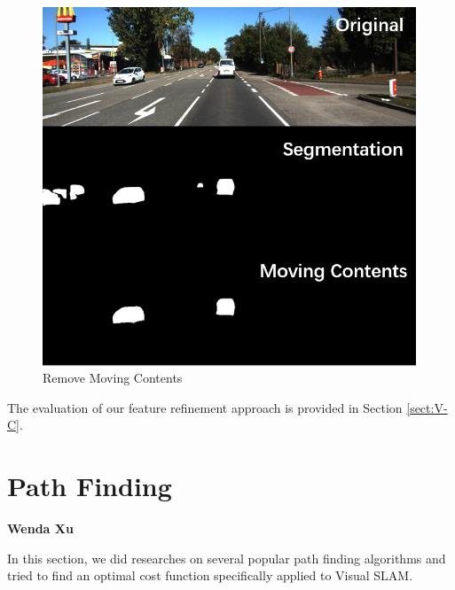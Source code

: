 \documentclass[letterpaper, 10 pt, conference]{IEEEtran}
\begin{document}
\begin{figure}[ht]
\includegraphics[scale=0.7]{images/maskrcnnrm.png}
\caption{Remove Moving Contents}
\label{fig:1}
\end{figure}

The evaluation of our feature refinement approach is provided in Section
\ref{sect:V-C}.

\section{Path Finding} \label{sect:\thesection}
\begin{center}\textbf{Wenda Xu}\end{center}

In this section, we did researches on several popular path finding algorithms
and tried to find an optimal cost function specifically applied to Visual SLAM. 
\end{document}
